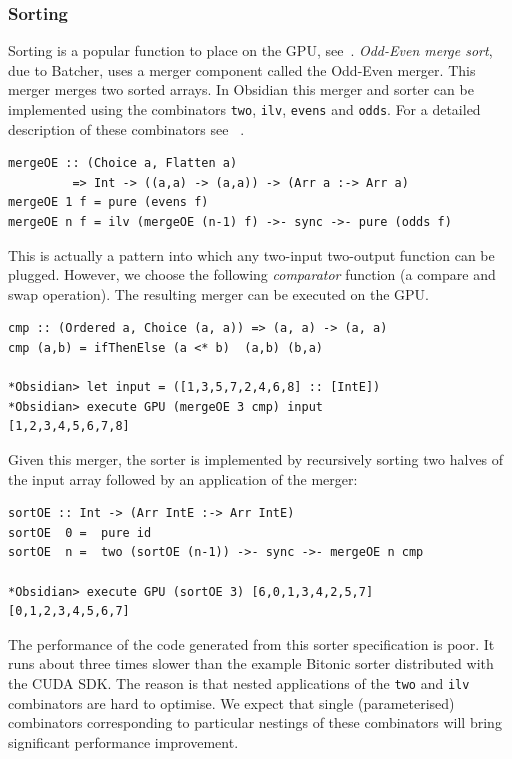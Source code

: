 \subsubsection{Sorting}

Sorting is a popular function to place on the GPU, see~\cite{SINTORNSORT,SORT3}.
{\em Odd-Even merge sort}, due to Batcher, uses a merger component called the Odd-Even merger. This 
merger merges two sorted arrays. In Obsidian this merger and sorter 
can be implemented using the combinators {\tt two}, {\tt ilv}, {\tt evens}
and {\tt odds}. For a detailed description of these combinators see
~\cite{LAVASORTER}.

\begin{small}
\begin{verbatim}
mergeOE :: (Choice a, Flatten a) 
         => Int -> ((a,a) -> (a,a)) -> (Arr a :-> Arr a)
mergeOE 1 f = pure (evens f)
mergeOE n f = ilv (mergeOE (n-1) f) ->- sync ->- pure (odds f)
\end{verbatim}
\end{small}
\noindent
This is actually a pattern into which any two-input two-output function
can be plugged. However, we choose the following {\em comparator} function (a compare and swap operation). The resulting merger can be executed on the GPU.
\begin{small}
\begin{verbatim}
cmp :: (Ordered a, Choice (a, a)) => (a, a) -> (a, a)
cmp (a,b) = ifThenElse (a <* b)  (a,b) (b,a)

*Obsidian> let input = ([1,3,5,7,2,4,6,8] :: [IntE]) 
*Obsidian> execute GPU (mergeOE 3 cmp) input
[1,2,3,4,5,6,7,8]
\end{verbatim}
\end{small}
\noindent
Given this merger, the sorter is implemented by recursively sorting 
two halves of the input array followed by an application of the merger:

\begin{small}
\begin{verbatim}
sortOE :: Int -> (Arr IntE :-> Arr IntE)
sortOE  0 =  pure id
sortOE  n =  two (sortOE (n-1)) ->- sync ->- mergeOE n cmp 

*Obsidian> execute GPU (sortOE 3) [6,0,1,3,4,2,5,7]
[0,1,2,3,4,5,6,7]
\end{verbatim}
\end{small}

The performance of the code generated from this sorter specification is poor. It
runs about three times slower than the example Bitonic
sorter distributed with the CUDA SDK. 
The reason is that nested applications of the {\tt two} and {\tt ilv} 
combinators are hard to optimise. We expect that single (parameterised) combinators corresponding
to particular nestings of these combinators will bring significant performance improvement.
%


